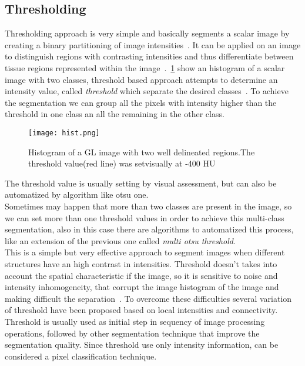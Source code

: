 \documentclass{standalone}
\begin{document}
\subsection{Thresholding}

Thresholding approach is very simple and basically segments a scalar image by creating a binary partitioning of image intensities~\cite{ART:Pham}. It can be applied on an image to distinguish regions with contrasting intensities and thus differentiate between tissue regions represented within the image~\cite{INP:Withey}. \figurename\,\ref{fig:Histogram} show an histogram of a scalar image with two classes, threshold based approach attempts to determine an intensity value, called \emph{threshold} which separate the desired classes~\cite{ART:Pham}. To achieve the segmentation we can group all the pixels with intensity higher than the threshold in one class an all the remaining in the other class. 

\begin{figure}[h!]

	\centering
		\texttt{[image: hist.png]}
	\caption{Histogram of a GL image with two well delineated regions.The threshold value(red line) was setvisually at -400 HU}\label{fig:Histogram}
\end{figure}

The threshold value is usually setting by visual assessment, but can also be automatized by algorithm like otsu one.\\
Sometimes may happen that more than two classes are present in the image, so we can set more than one threshold values in order to achieve this multi-class segmentation, also in this case there are algorithms to automatized this process, like an extension of the previous one called \emph{multi otsu threshold}.\\
This is a simple but very effective approach to segment images when different structures have an high contrast in intensities. Threshold doesn't takes into account the spatial characteristic if the image, so it is sensitive to noise and intensity inhomogeneity, that corrupt the image histogram of the image and making difficult the separation~\cite{ART:Pham}. To overcome these difficulties several variation of threshold have been proposed based on local intensities and connectivity. \\
Threshold is usually used as initial step in sequency of image processing operations, followed by other segmentation technique that improve the segmentation quality. 
Since threshold use only intensity information, can be considered a pixel classification technique. 
\end{document}
